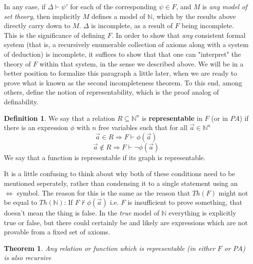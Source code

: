 \documentclass{article}
\theoremstyle{definition}
\newtheorem{definition}{Definition}[section]
\theoremstyle{plain}
\theoremstyle{theorem}
\newtheorem{theorem}{Theorem}[section]
\begin{document}
\par In any case, if $\Delta \vdash \psi'$ for each of the corresponding $\psi \in F$, and $M$ is \textit{any model of set theory}, then implicitly $M$ defines a model of $\mathbb{N}$, which by the results above directly carry down to $M$. $\Delta$ is incomplete, as a result of $F$ being incomplete. This is the significance of defining $F$. In order to show that \textit{any} consistent formal system (that is, a recursively enumerable collection of axioms along with a system of deduction) is incomplete, it suffices to show that that one can "interpret" the theory of $F$ within that system, in the sense we described above. We will be in a better position to formalize this paragraph a little later, when we are ready to prove what is known as the second incompleteness theorem. To this end, among others, define the notion of representability, which is the proof analog of definability.
\begin{definition}
    We say that a relation $R \subseteq \mathbb{N}^n$ is \textbf{representable} in $F$ (or in $PA$) if there is an expression $\phi$ with $n$ free variables such that for all $\vec{a} \in \mathbb{N}^n$
    \[\vec{a} \in R \Rightarrow F \vdash \phi(\vec{a}) \]
    \[\vec{a} \notin R \Rightarrow F \vdash \neg\phi(\vec{a}) \]
    We say that a function is representable if its graph is representable.
\end{definition}
It is a little confusing to think about why both of these conditions need to be mentioned seperately, rather than condensing it to a single statement using an $\iff$ symbol. The reason for this is the same as the reason that $Th(F)$ might not be equal to $Th(\mathbb{N})$: If $F \nvdash \phi(\vec{a})$ i.e. $F$ is insufficient to prove something, that doesn't mean the thing is false. In the \textit{true} model of $\mathbb{N}$ everything is explicitly true or false, but there could certainly be and likely are expressions which are not provable from a fixed set of axioms. 
\begin{theorem}
    Any relation or function which is representable (in either $F$ or $PA$) is also recursive
\end{theorem}
\end{document}
